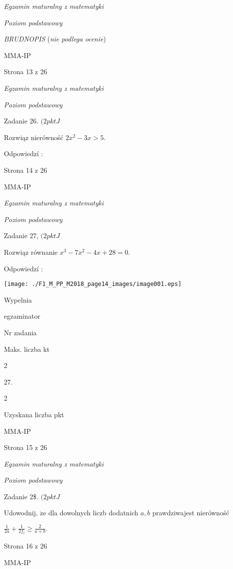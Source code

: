 \documentclass[a4paper,12pt]{article}
\begin{document}
{\it Egzamin maturalny z matematyki}

{\it Poziom podstawowy}

{\it BRUDNOPIS} ({\it nie podlega ocenie})

MMA-IP

Strona 13 z 26





{\it Egzamin maturalny z matematyki}

{\it Poziom podstawowy}

Zadanie 26. $(2pktJ$

Rozwiąz nierówność $2x^{2}-3x>5.$

Odpowiedzí :

Strona 14 z 26

MMA-IP





{\it Egzamin maturalny z matematyki}

{\it Poziom podstawowy}

Zadanie 27, $(2pktJ$

Rozwiąz równanie $x^{3}-7x^{2}-4x+28=0.$

Odpowiedzí :
\begin{center}
\texttt{[image: ./F1\_M\_PP\_M2018\_page14\_images/image001.eps]}
\end{center}
Wypelnia

egzaminator

Nr zadania

Maks. liczba kt

2

27.

2

Uzyskana liczba pkt

MMA-IP

Strona 15 z 26





{\it Egzamin maturalny z matematyki}

{\it Poziom podstawowy}

Zadanie 2{\$}. $(2pktJ$

Udowodnij, $\dot{\mathrm{z}}\mathrm{e}$ dla dowolnych liczb dodatnich $a, b$ prawdziwajest nierówność

$\displaystyle \frac{1}{2a}+\frac{1}{2f_{i}}\geq\frac{2}{a+b}.$

Strona 16 z 26

MMA-IP
\end{document}
